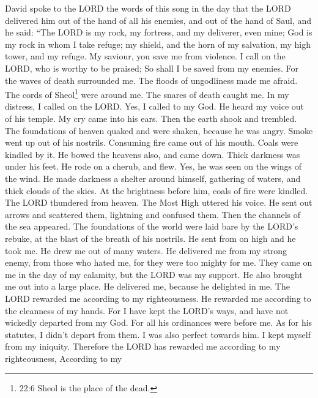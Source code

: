  David spoke to the LORD the words of this song in the day
that the LORD delivered him out of the hand of all his enemies, and out
of the hand of Saul,  and he said: ``The LORD is my rock, my
fortress, and my deliverer, even mine;  God is my rock in
whom I take refuge; my shield, and the horn of my salvation, my high
tower, and my refuge. My saviour, you save me from violence.
 I call on the LORD, who is worthy to be praised; So shall I
be saved from my enemies.  For the waves of death surrounded
me. The floods of ungodliness made me afraid.  The cords of
Sheol\footnote{22:6 Sheol is the place of the dead.} were around me. The
snares of death caught me.  In my distress, I called on the
LORD. Yes, I called to my God. He heard my voice out of his temple. My
cry came into his ears.  Then the earth shook and trembled.
The foundations of heaven quaked and were shaken, because he was angry.
 Smoke went up out of his nostrils. Consuming fire came out
of his mouth. Coals were kindled by it.  He bowed the
heavens also, and came down. Thick darkness was under his feet.
 He rode on a cherub, and flew. Yes, he was seen on the
wings of the wind.  He made darkness a shelter around
himself, gathering of waters, and thick clouds of the skies.
 At the brightness before him, coals of fire were kindled.
 The LORD thundered from heaven. The Most High uttered his
voice.  He sent out arrows and scattered them, lightning
and confused them.  Then the channels of the sea appeared.
The foundations of the world were laid bare by the LORD's rebuke, at the
blast of the breath of his nostrils.  He sent from on high
and he took me. He drew me out of many waters.  He
delivered me from my strong enemy, from those who hated me, for they
were too mighty for me.  They came on me in the day of my
calamity, but the LORD was my support.  He also brought me
out into a large place. He delivered me, because he delighted in me.
 The LORD rewarded me according to my righteousness. He
rewarded me according to the cleanness of my hands.  For I
have kept the LORD's ways, and have not wickedly departed from my God.
 For all his ordinances were before me. As for his
statutes, I didn't depart from them.  I was also perfect
towards him. I kept myself from my iniquity.  Therefore the
LORD has rewarded me according to my righteousness, According to my
